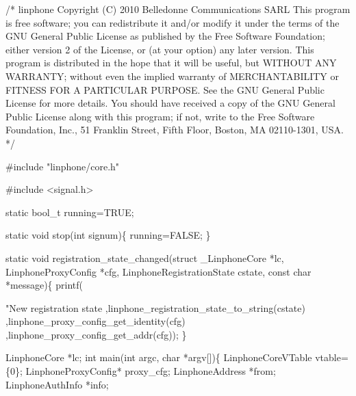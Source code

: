 \begin{DoxyCodeInclude}

\textcolor{comment}{/*}
\textcolor{comment}{linphone}
\textcolor{comment}{Copyright (C) 2010  Belledonne Communications SARL}
\textcolor{comment}{}
\textcolor{comment}{This program is free software; you can redistribute it and/or}
\textcolor{comment}{modify it under the terms of the GNU General Public License}
\textcolor{comment}{as published by the Free Software Foundation; either version 2}
\textcolor{comment}{of the License, or (at your option) any later version.}
\textcolor{comment}{}
\textcolor{comment}{This program is distributed in the hope that it will be useful,}
\textcolor{comment}{but WITHOUT ANY WARRANTY; without even the implied warranty of}
\textcolor{comment}{MERCHANTABILITY or FITNESS FOR A PARTICULAR PURPOSE.  See the}
\textcolor{comment}{GNU General Public License for more details.}
\textcolor{comment}{}
\textcolor{comment}{You should have received a copy of the GNU General Public License}
\textcolor{comment}{along with this program; if not, write to the Free Software}
\textcolor{comment}{Foundation, Inc., 51 Franklin Street, Fifth Floor, Boston, MA  02110-1301, USA.}
\textcolor{comment}{*/}

\textcolor{preprocessor}{#include "linphone/core.h"}

\textcolor{preprocessor}{#include <signal.h>}

\textcolor{keyword}{static} bool\_t running=TRUE;

\textcolor{keyword}{static} \textcolor{keywordtype}{void} stop(\textcolor{keywordtype}{int} signum)\{
        running=FALSE;
\}

\textcolor{keyword}{static} \textcolor{keywordtype}{void} registration\_state\_changed(\textcolor{keyword}{struct} \_LinphoneCore *lc, 
      LinphoneProxyConfig *cfg, LinphoneRegistrationState cstate, \textcolor{keyword}{const} \textcolor{keywordtype}{char} *message)\{
                printf(\textcolor{stringliteral}{"New registration state %
                                ,linphone_registration_state_to_string(cstate)
                                ,linphone_proxy_config_get_identity(cfg)
                                ,linphone\_proxy\_config\_get\_addr(cfg));
\}

LinphoneCore *lc;
\textcolor{keywordtype}{int} main(\textcolor{keywordtype}{int} argc, \textcolor{keywordtype}{char} *argv[])\{
        LinphoneCoreVTable vtable=\{0\};
        LinphoneProxyConfig* proxy\_cfg;
        LinphoneAddress *from;
        LinphoneAuthInfo *info;

}
\end{DoxyCodeInclude}
